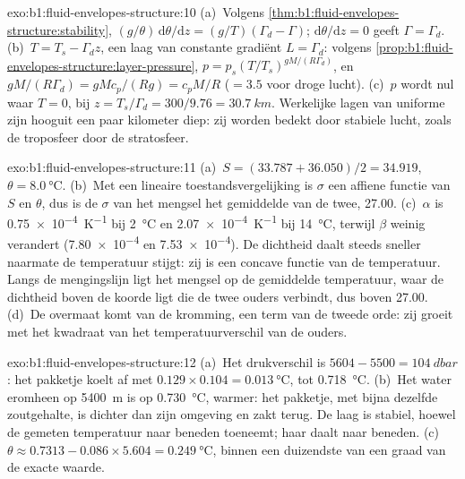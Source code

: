 \begin{solution}{exo:b1:fluid-envelopes-structure:10}
(a)~Volgens \cref{thm:b1:fluid-envelopes-structure:stability}, $(g/\theta)\,\mathrm
d\theta/\mathrm dz = (g/T)(\Gamma_d - \Gamma)$; $\mathrm d\theta/\mathrm dz = 0$
geeft $\Gamma = \Gamma_d$. (b)~$T = T_s - \Gamma_d z$, een laag van constante gradiënt
$L = \Gamma_d$: volgens \cref{prop:b1:fluid-envelopes-structure:layer-pressure}, $p =
p_s (T/T_s)^{gM/(R\Gamma_d)}$, en $gM/(R\Gamma_d) = gMc_p/(Rg) = c_pM/R$
($= 3.5$ voor droge lucht). (c)~$p$ wordt nul waar $T = 0$, bij $z = T_s/\Gamma_d =
300/9.76 = \qty{30.7}{km}$. Werkelijke lagen van uniforme  zijn hooguit een
paar kilometer diep: zij worden bedekt door stabiele lucht, zoals de troposfeer door
de stratosfeer.
\end{solution}

\begin{solution}{exo:b1:fluid-envelopes-structure:11}
(a)~$S = (33.787 + 36.050)/2 = 34.919$, $\theta = \qty{8.0}{\celsius}$.
(b)~Met een lineaire toestandsvergelijking is $\sigma$ een affiene functie van $S$ en
$\theta$, dus is de $\sigma$ van het mengsel het gemiddelde van de twee, 27.00.
(c)~$\alpha$ is \qty{0.75e-4}{K^{-1}} bij \qty{2}{\celsius} en
\qty{2.07e-4}{K^{-1}} bij \qty{14}{\celsius}, terwijl $\beta$ weinig verandert
(\num{7.80e-4} en \num{7.53e-4}). De dichtheid daalt steeds sneller naarmate de
temperatuur stijgt: zij is een concave functie van de temperatuur. Langs de mengingslijn ligt het mengsel op de gemiddelde temperatuur, waar de dichtheid boven de koorde
ligt die de twee ouders verbindt, dus boven 27.00. (d)~De overmaat komt van de kromming, een term van de tweede orde: zij groeit met het kwadraat van het temperatuurverschil van de ouders.
\end{solution}

\begin{solution}{exo:b1:fluid-envelopes-structure:12}
(a)~Het drukverschil is $5604 - 5500 = \qty{104}{dbar}$: het pakketje koelt af met
$0.129 \times 0.104 = \qty{0.013}{\celsius}$, tot \qty{0.718}{\celsius}.
(b)~Het water eromheen op \qty{5400}{m} is op \qty{0.730}{\celsius}, warmer: het pakketje, met bijna
dezelfde zoutgehalte, is dichter dan zijn omgeving en zakt terug. De laag is stabiel, hoewel de gemeten temperatuur naar beneden toeneemt; haar  daalt naar beneden. (c)~$\theta \approx
0.7313 - 0.086 \times 5.604 = \qty{0.249}{\celsius}$, binnen een duizendste van een
graad van de exacte waarde.
\end{solution}

